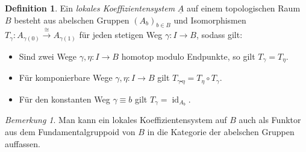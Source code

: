 \documentclass[11pt, a4paper, german]{article}
\theoremstyle{definition}
\newtheorem*{bsp}{Beispiel}
\newtheorem*{defn}{Definition}
\theoremstyle{remark}
\newtheorem*{bem}{Bemerkung}
\DeclareMathOperator{\id}{id} %
\begin{document}
\iffalse

Sei im Folgenden $B$ wegzusammenhängend.
Wir haben gezeigt, dass dann alle Fasern diesselbe Kohomologiegruppen besitzen.
Wir können also von der Kohomologie der Faser $F$ sprechen, wobei $F \coloneqq p^{-1}(b_0)$ für ein beliebiges $b_0 \in B$.
Die Fundamentalgruppe $\pi_1(B, b_0)$ operiert auf $H^*(F)$ durch $[\gamma] \mapsto T_\gamma$.

\begin{defn}
  Ein \emph{Bündel von Gruppen} auf einem topologischen Raum $B$ besteht aus einer Gruppe $G$, einer Abbildung $q : A \to B$ und Bijektionen $g_b : q^{-1}(b) \xrightarrow{\cong} G$ für alle $b \in B$, welche den Fasern von $q$ eine zu $G$ isomorphe Gruppenstruktur verleihen, sodass gilt:
  Für jeden Punkt $x \in B$ gibt es eine Umgebung $U \subset B$, sodass
  \[
    g_U : q^{-1}(U) \to U \times G, \quad
    y \mapsto (q(y), g_{q(y)}(y))
  \]
  stetig und sogar ein Homöomorphismus ist.
\end{defn}

\begin{bsp}
  Sei $G$ eine Gruppe.
  Die Projektion $B \times G \to B$ ist in kanonischer Weise ein Bündel von Gruppen auf $B$.
\end{bsp}
\fi


\begin{defn}
  Ein \emph{lokales Koeffizientensystem} $\underline{A}$ auf einem topologischen Raum $B$ besteht aus abelschen Gruppen $(A_b)_{b \in B}$ und Isomorphismen $T_\gamma : A_{\gamma(0)} \xrightarrow{\cong} A_{\gamma(1)}$ für jeden stetigen Weg $\gamma : I \to B$, sodass gilt:
  \begin{itemize}
    \item Sind zwei Wege $\gamma, \eta : I \to B$ homotop modulo Endpunkte, so gilt $T_\gamma = T_\eta$.
    \item Für komponierbare Wege $\gamma, \eta : I \to B$ gilt $T_{\gamma \centerdot \eta} = T_\eta \circ T_\gamma$.
    \item Für den konstanten Weg $\gamma \equiv b$ gilt $T_\gamma = \id_{A_b}$.
  \end{itemize}
\end{defn}

\begin{bem}
  Man kann ein lokales Koeffizientensystem auf $B$ auch als Funktor aus dem Fundamentalgruppoid von $B$ in die Kategorie der abelschen Gruppen auffassen.
\end{bem}
\end{document}
